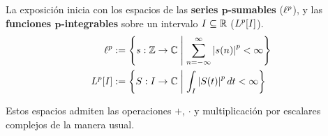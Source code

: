 %

La exposición inicia con los espacios de las \textbf{series $\boldsymbol{p}$-sumables}
($\ell^{p}$), y las  \textbf{funciones $\boldsymbol{p}$-integrables} sobre un intervalo 
$I \subseteq \mathbb{R}$ ($L^{p}[I]$).
%
\begin{align*}
\ell^{p} &:= \left\{ s: \mathbb{Z}\rightarrow\mathbb{C} \mathrel{}\middle|\mathrel{} \sum_{n=-\infty}^{\infty} \left| s(n) \right|^{p} < \infty \right\}
\\
L^{p}[I] &:= \left\{ S: I\rightarrow\mathbb{C} \mathrel{}\middle|\mathrel{} \int_I \left| S(t) \right|^{p} dt < \infty \right\}
\end{align*}

Estos espacios admiten las operaciones $+$, $\cdot$ y multiplicación por escalares complejos de la 
manera usual.%

%

